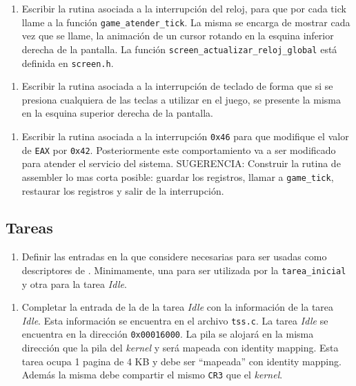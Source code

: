     \begin{enumerate}[resume,label=(\alph*)]
      \item Escribir la rutina asociada a la interrupción del reloj, para que por cada tick llame a la función \texttt{game\_atender\_tick}. La misma se encarga de mostrar cada vez que se llame, la animación de un cursor rotando en la esquina inferior derecha de la pantalla. La función \texttt{screen\_actualizar\_reloj\_global} está definida en \texttt{screen.h}.
    \end{enumerate}

    \begin{enumerate}[resume,label=(\alph*)]
      \item Escribir la rutina asociada a la interrupción de teclado de forma que si se presiona cualquiera de las teclas a utilizar en el juego, se presente la misma en la esquina superior derecha de la pantalla.
    \end{enumerate}

    \begin{enumerate}[resume,label=(\alph*)]
      \item Escribir la rutina asociada a la interrupción \texttt{0x46} para que modifique el valor de \texttt{EAX} por \texttt{0x42}. Posteriormente este comportamiento va a ser modificado para atender el servicio del sistema.
      SUGERENCIA: Construir la rutina de assembler lo mas corta posible: guardar los registros, llamar a \texttt{game\_tick}, restaurar los registros y salir de la interrupción.
    \end{enumerate}
  
  \subsection{Tareas}
    \begin{enumerate}[label=(\alph*)]
      \item Definir las entradas en la  que considere necesarias para ser usadas como descriptores de . Minimamente, una para ser utilizada por la \texttt{tarea\_inicial} y otra para la tarea \emph{Idle}.
    \end{enumerate}

    \begin{enumerate}[resume,label=(\alph*)]
      \item Completar la entrada de la  de la tarea \emph{Idle} con la información de la tarea \emph{Idle}. Esta información se encuentra en el archivo \texttt{tss.c}. La tarea \emph{Idle} se encuentra en la dirección \texttt{0x00016000}. La pila se alojará en la misma dirección que la pila del \emph{kernel} y será mapeada con identity mapping. Esta tarea ocupa 1 pagina de 4 KB y debe ser ``mapeada'' con identity mapping. Además la misma debe compartir el mismo \texttt{CR3} que el \emph{kernel}.
    \end{enumerate}

